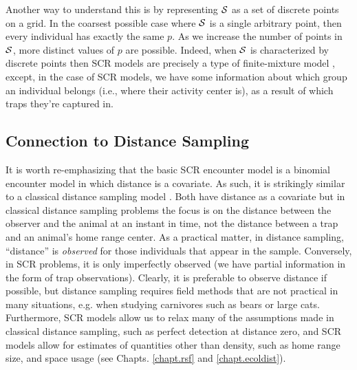 Another way to understand this is by representing ${\cal S}$ as a set
of discrete points on a grid. In the coarsest possible case where
${\cal S}$ is a single arbitrary point, then every individual has
exactly the same $p$. As we increase the number of points in ${\cal
  S}$,  more distinct values of $p$ are possible. Indeed, when
${\cal S}$ is characterized by discrete points then SCR models are
precisely a type of finite-mixture model \citep{norris_pollock:1996,
  pledger:2000}, except, in the case of SCR models, we have some information about which
group an individual belongs (i.e., where their activity center is), as
a result of which traps they're captured in.

\subsection{Connection to Distance Sampling}

It is worth re-emphasizing that the basic SCR encounter model is a binomial
encounter model in which distance is a covariate. As such, it is
strikingly similar to a classical distance sampling model
\citep{buckland_etal:2001}. Both have distance as a covariate but in
classical distance sampling problems the focus is on the distance
between the observer and the animal at an instant in time, not the
distance between a trap and an animal's home range center. As a
practical matter, in distance sampling, ``distance'' is {\it observed}
for those individuals that appear in the sample. Conversely, in SCR
problems, it is only imperfectly observed (we have partial information
in the form of trap observations).  Clearly, it is preferable to
observe distance if possible, but distance sampling requires field
methods that are not practical in many situations, e.g. when
studying carnivores such as bears or large cats. Furthermore, SCR
models allow us to relax many of the assumptions made in classical
distance sampling, such as perfect detection at distance zero, and SCR
models allow for estimates of quantities other than density, such as
home range size, and space usage (see Chapts. \ref{chapt.rsf} and
\ref{chapt.ecoldist}).


